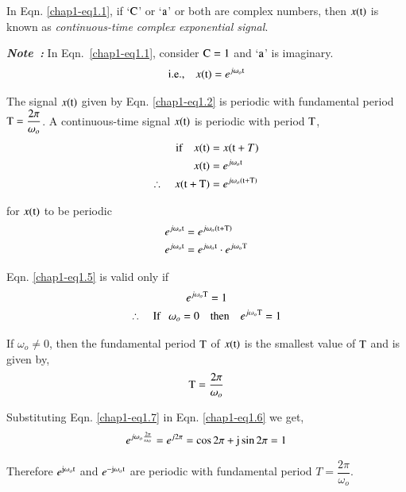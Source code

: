 In Eqn. \eqref{chap1-eq1.1}, if `$\textrm{C}$' or `$\textrm{a}$' or both are complex numbers, then $x(\textrm{t})$ is known as {\em continuous-time complex exponential signal}.

\medskip
\noindent
{\it\bfseries Note~:} In Eqn.~\eqref{chap1-eq1.1}, consider $\textrm{C}=1$ and `$\textrm{a}$' is imaginary.
\begin{equation}
\text{i.e.,}\quad x(\textrm{t})=e^{j\omega_{o}\textrm{t}}\label{chap1-eq1.2}
\end{equation}

The signal $x(\textrm{t})$ given by Eqn. \eqref{chap1-eq1.2} is periodic with fundamental period $\textrm{T}=\dfrac{2\pi}{\omega_{o}}$. A continuous-time signal $x(\textrm{t})$ is periodic with period $\textrm{T}$,
\begin{align}
\text{if}\quad x(\textrm{t}) &= x(\textrm{t}+T)\notag\\
x(\textrm{t}) &= e^{j\omega_{o}\textrm{t}}\label{chap1-eq1.3}\\
\therefore\quad x(\textrm{t}+\textrm{T}) &= e^{j\omega_{o}(\textrm{t}+\textrm{T})}\label{chap1-eq1.4}
\end{align}

for $x(\textrm{t})$ to be periodic
\begin{align}
e^{j\omega_{o}\textrm{t}} &= e^{j\omega_{o}(\textrm{t}+\textrm{T})}\notag\\
e^{j\omega_{o}\textrm{t}} &= e^{j\omega_{o}\textrm{t}}\cdot e^{j\omega_{o}\textrm{T}}\label{chap1-eq1.5}
\end{align}

Eqn. \eqref{chap1-eq1.5} is valid only if
\begin{gather}
e^{j\omega_{o}\textrm{T}}=1\notag\\
\therefore\quad \text{If~~ } \omega_{o}=0\quad\text{then}\quad e^{j\omega_{o}\textrm{T}}=1\label{chap1-eq1.6}
\end{gather}

If $\omega_{o}\neq 0$, then the fundamental period $\textrm{T}$ of $x(\textrm{t})$ is the smallest value of $\textrm{T}$ and is given by,
\begin{equation}
\textrm{T}=\dfrac{2\pi}{\omega_{o}}\label{chap1-eq1.7}
\end{equation}

Substituting Eqn. \eqref{chap1-eq1.7} in Eqn. \eqref{chap1-eq1.6} we get,
\begin{equation}
e^{j\omega_{o}\frac{2\pi}{\omega_{o}}}=e^{j2\pi}=\cos 2\pi + \textrm{j}\sin 2\pi =1\label{chap1-eq1.8}
\end{equation}

Therefore $e^{\textrm{j}\omega_{o}\textrm{t}}$ and $e^{-\textrm{j}\omega_{o}\textrm{t}}$ are periodic with fundamental period $T=\dfrac{2\pi}{\omega_{o}}$.

